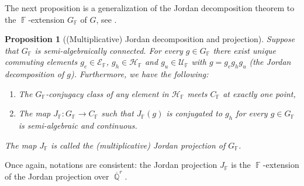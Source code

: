 \documentclass{amsart}
\theoremstyle{plain}
\newtheorem{proposition}{Proposition}[section]
\theoremstyle{definition}
\DeclareMathOperator{\Fb}{{\mathbb{F}}}
\DeclareMathOperator{\Qb}{\mathbb{Q}}
\newcommand{\1}{\mathbf{1}}
\begin{document}
The next proposition is a generalization of the Jordan decomposition theorem to the $\Fb$-extension $G_{\Fb}$ of $G$, see \cite[Lemma 4.5, Lemma 4.6, Proposition 4.7]{BurgerIozziParreauPozzetti_RSCCharacterVarieties2}.

\begin{proposition}[(Multiplicative) Jordan decomposition and projection]
\label{propo: Jordan proj}
Suppose that $G_{\Fb}$ is semi-algebraically connected. For every $g \in G_{\Fb}$ there exist unique commuting
elements $g_e \in \mathcal{E}_{\Fb}$, $g_h \in \mathcal{H}_{\Fb}$ and $g_u \in \mathcal{U}_{\Fb}$ with $g = g_e g_h g_u$ (the \emph{Jordan decomposition} of $g$). Furthermore, we have the following:
\begin{enumerate}
\item The $G_{\Fb}$-conjugacy class of any element in $\mathcal{H}_{\Fb}$ meets $C_{\Fb}$ at exactly one point,
\item The map $J_{\Fb} : G_{\Fb} \to C_{\Fb}$ such that $J_{\Fb}(g)$ is conjugated to $g_h$ for every $g\in G_{\Fb}$ is semi-algebraic and continuous.
\end{enumerate}
The map $J_{\Fb}$ is called the \emph{(multiplicative) Jordan projection} of $G_{\Fb}$.
\end{proposition}

Once again, notations are consistent: the Jordan projection $J_{\Fb}$ is the $\Fb$-extension of the Jordan projection over $\overline{\Qb}^r$.
\end{document}
